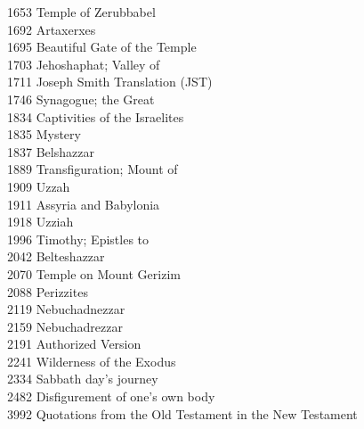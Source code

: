 1653 \quad Temple of Zerubbabel\\
1692 \quad Artaxerxes\\
1695 \quad Beautiful Gate of the Temple\\
1703 \quad Jehoshaphat; Valley of\\
1711 \quad Joseph Smith Translation (JST)\\
1746 \quad Synagogue; the Great\\
1834 \quad Captivities of the Israelites\\
1835 \quad Mystery\\
1837 \quad Belshazzar\\
1889 \quad Transfiguration; Mount of\\
1909 \quad Uzzah\\
1911 \quad Assyria and Babylonia\\
1918 \quad Uzziah\\
1996 \quad Timothy; Epistles to\\
2042 \quad Belteshazzar\\
2070 \quad Temple on Mount Gerizim\\
2088 \quad Perizzites\\
2119 \quad Nebuchadnezzar\\
2159 \quad Nebuchadrezzar\\
2191 \quad Authorized Version\\
2241 \quad Wilderness of the Exodus\\
2334 \quad Sabbath day’s journey\\
2482 \quad Disfigurement of one’s own body\\
3992 \quad Quotations from the Old Testament in the New Testament\\
